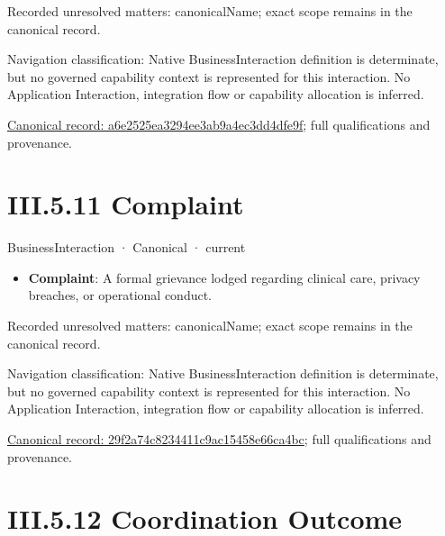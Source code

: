 {\small Recorded unresolved matters: canonicalName; exact scope remains in the canonical record.}\par
{\small Navigation classification: Native BusinessInteraction definition is determinate, but no governed capability context is represented for this interaction. No Application Interaction, integration flow or capability allocation is inferred.}\par
{\footnotesize \href{../../../../../../../continuum/business/business-interaction/a6e2525ea3294ee3ab9a4ec3dd4dfe9f.md}{Canonical record: a6e2525ea3294ee3ab9a4ec3dd4dfe9f}; full qualifications and provenance.}\par
\section*{III.5.11 Complaint}
\label{navigation:III.5.11}

\label{element:29f2a74c8234411c9ac15458e66ca4bc}
{\small BusinessInteraction · Canonical · current}\par

\begin{itemize}


\item \textbf{Complaint}: A formal grievance lodged regarding clinical care, privacy breaches, or operational conduct.

\end{itemize}

{\small Recorded unresolved matters: canonicalName; exact scope remains in the canonical record.}\par
{\small Navigation classification: Native BusinessInteraction definition is determinate, but no governed capability context is represented for this interaction. No Application Interaction, integration flow or capability allocation is inferred.}\par
{\footnotesize \href{../../../../../../../continuum/business/business-interaction/29f2a74c8234411c9ac15458e66ca4bc.md}{Canonical record: 29f2a74c8234411c9ac15458e66ca4bc}; full qualifications and provenance.}\par
\section*{III.5.12 Coordination Outcome}
\label{navigation:III.5.12}

